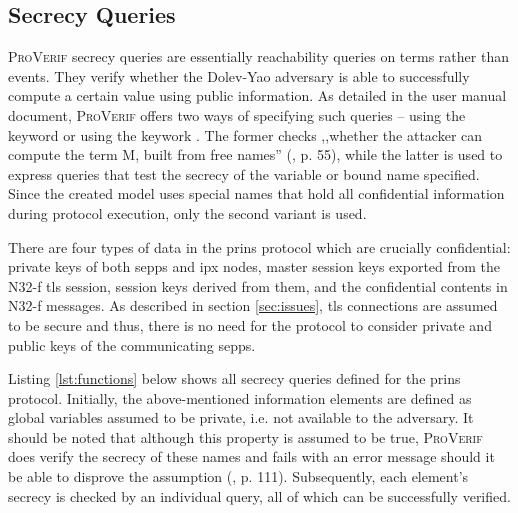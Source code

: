 \subsection{Secrecy Queries}

\textsc{ProVerif} secrecy queries are essentially reachability queries on terms rather than events.
They verify whether the Dolev-Yao adversary is able to successfully compute a certain value using public information.
As detailed in the user manual document, \textsc{ProVerif} offers two ways of specifying such queries -- using the keyword {} or using the keywork {}.
The former checks ,,whether the attacker can compute the term M, built from free names'' (\cite{blanchet2020proverif}, p. 55), while the latter is used to express queries that test the secrecy of the variable or bound name specified.
Since the created model uses special names that hold all confidential information during protocol execution, only the second variant is used.

There are four types of data in the \gls{prins} protocol which are crucially confidential: private keys of both \glspl{sepp} and \gls{ipx} nodes, master session keys exported from the N32-f \gls{tls} session, session keys derived from them, and the confidential contents in N32-f messages.
As described in section \ref{sec:issues}, \gls{tls} connections are assumed to be secure and thus, there is no need for the protocol to consider private and public keys of the communicating \glspl{sepp}.

Listing \ref{lst:functions} below shows all secrecy queries defined for the \gls{prins} protocol.
Initially, the above-mentioned information elements are defined as global variables assumed to be private, i.e. not available to the adversary.
It should be noted that although this property is assumed to be true, \textsc{ProVerif} does verify the secrecy of these names and fails with an error message should it be able to disprove the assumption (\cite{blanchet2020proverif}, p. 111).
Subsequently, each element's secrecy is checked by an individual query, all of which can be successfully verified.

